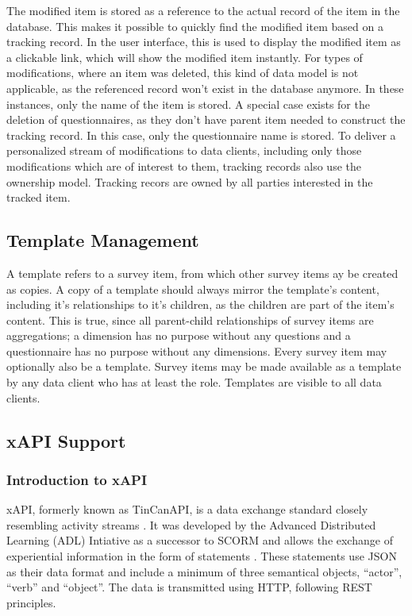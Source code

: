     The modified item is stored as a reference to the actual record of the item in the database.
    This makes it possible to quickly find the modified item based on
    a tracking record. In the user interface, this is used to display the
    modified item as a clickable link, which will show the modified item
    instantly. For types of modifications, where an item was deleted, this 
    kind of data model is not applicable, as the referenced record won't 
    exist in the database anymore. In these instances, only the name of
    the item is stored. A special case exists for the deletion of questionnaires,
    as they don't have parent item needed to construct the tracking record.
    In this case, only the questionnaire name is stored.
    To deliver a personalized stream of modifications to data clients,
    including only those modifications which are of interest to them,
    tracking records also use the ownership model.
    Tracking recors are owned by all parties interested in the tracked
    item.

\subsection{Template Management}
    A template refers to a survey item, from which other survey items
    ay be created as copies. A copy of a template should always
    mirror the template's content, including it's relationships
    to it's children, as the children are part of the item's content.
    This is true, since all parent-child relationships 
    of survey items are aggregations; a dimension has no purpose
    without any questions and a questionnaire has no purpose
    without any dimensions. Every survey item may optionally also
    be a template. Survey items may be made available as a template by 
    any data client who has at least the  role.
    Templates are visible to all data clients.


\subsection{xAPI Support}
    \subsubsection{Introduction to xAPI}
        xAPI, formerly known as TinCanAPI, is a data exchange
        standard closely resembling activity streams \cite{activity-streams}.
        It was developed by the Advanced Distributed Learning (ADL) Intiative
        as a successor to SCORM \cite{scorm,xapi-history} and allows the exchange of experiential
        information in the form of statements \cite{xapi-object-model}. These statements
        use JSON as their data format and include a minimum of three
        semantical objects, ``actor'', ``verb'' and ``object''. 
        The data is transmitted using HTTP, following REST principles.

